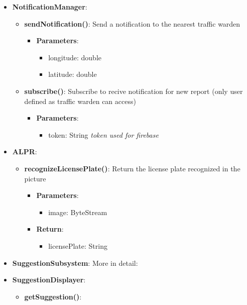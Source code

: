 \documentclass{article}
\begin{document}
\begin{itemize}
	\item \textbf{NotificationManager}:
		\begin{itemize}
			\item \textbf{sendNotification()}:
				Send a notification to the nearest traffic warden
				\begin{itemize}
					\item \textbf{Parameters}:
						\begin{itemize}
							\item longitude: double
							\item latitude: double
						\end{itemize}
				\end{itemize}
			\item \textbf{subscribe()}:
			Subscribe to recive notification for new report (only user defined as traffic warden can access)
				\begin{itemize}
					\item \textbf{Parameters}:
						\begin{itemize}
							\item token: String \textit{token used for firebase}
						\end{itemize}
				\end{itemize}
			\end{itemize}
	\item \textbf{ALPR}:
		\begin{itemize}
			\item \textbf{recognizeLicensePlate()}:
			Return the license plate recognized in the picture
				\begin{itemize}
					\item \textbf{Parameters}:
						\begin{itemize}
							\item image: ByteStream
						\end{itemize}
					\item \textbf{Return}:
						\begin{itemize}
							\item licensePlate: String
						\end{itemize}
				\end{itemize}
		\end{itemize}
	\item \textbf{SuggestionSubsystem}: More in detail:
	\item \textbf{SuggestionDisplayer}:
		\begin{itemize}
			\item \textbf{getSuggestion()}:

\end{itemize}
\end{itemize}
\end{document}
